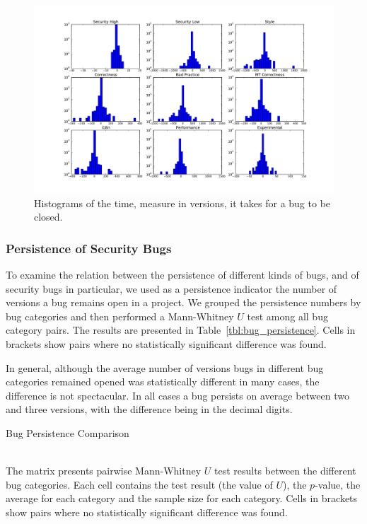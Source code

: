 \documentclass[conference]{llncs}
\begin{document}
\begin{figure}
  \centering
  \includegraphics[scale=0.4]{bugdiffs}
  \caption{Histograms of the time, measure in versions, it takes for a
    bug to be closed. }
  \label{fig:bugdiffs}
\end{figure}


\subsubsection{Persistence of Security Bugs}

To examine the relation between the persistence of different kinds of
bugs, and of security bugs in particular, we used as a persistence
indicator the number of versions a bug remains open in a project. We
grouped the persistence numbers by bug categories and then performed a
Mann-Whitney $U$ test among all bug category pairs. The results are
presented in Table~\ref{tbl:bug_persistence}. Cells in brackets show
pairs where no statistically significant difference was found.

In general, although the average number of versions bugs in different
bug categories remained opened was statistically different in many
cases, the difference is not spectacular. In all cases a bug persists
on average between two and three versions, with the difference being
in the decimal digits.

\begin{landscape}
  \begin{table}
    \setlength{\extrarowheight}{0.10cm}
    \caption{Bug Persistence Comparison}
    \label{tbl:bug_persistence}
    \resizebox{0.95\columnwidth}{!}{
    }\\
    The matrix presents pairwise Mann-Whitney $U$ test results
    between the different bug categories. Each cell contains the test
    result (the value of $U$), the $p$-value, the average for each
    category and the sample size for each category. Cells in brackets show
    pairs where no statistically significant difference was found.
  \end{table}
\end{landscape}
\end{document}
